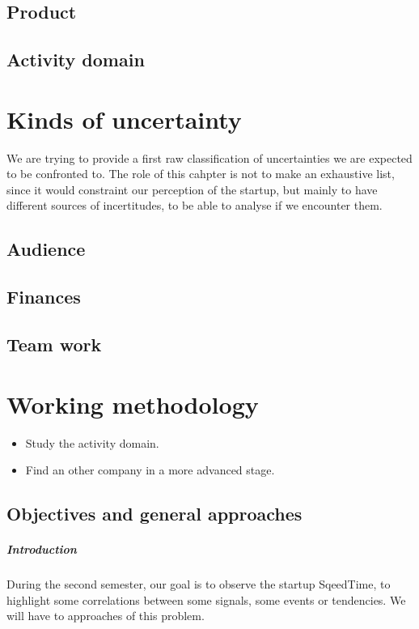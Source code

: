 \documentclass[twoside]{report}
\begin{document}
\section{Product}
\section{Activity domain}
\chapter{Kinds of uncertainty}
We are trying to provide a first raw classification of uncertainties we are expected to be confronted to. The role of this cahpter is not to make an exhaustive list, since it would constraint our perception of the startup, but mainly to have different sources of incertitudes, to be able to analyse if we encounter them.
\section{Audience}
\section{Finances}
\section{Team work}

\chapter{Working methodology}
\begin{itemize}
	\item Study the activity domain.
	\item Find an other company in a more advanced stage.
\end{itemize}
\section{Objectives and general approaches}
\paragraph{Introduction }During the second semester, our goal is to observe the startup SqeedTime, to highlight some correlations between some signals, some events or tendencies. We will have to approaches of this problem.
\end{document}
